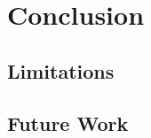 \section{Conclusion}
\label{s_Conclusion}


\subsection{Limitations}
\label{s_Conclusion_Limitations}


\subsection{Future Work}
\label{s_Conclusion_FutureWork}

